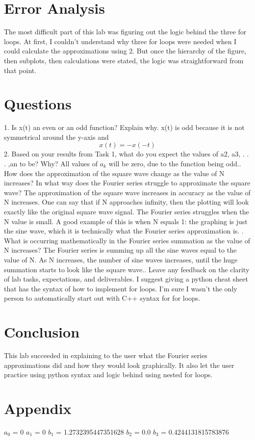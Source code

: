 \documentclass[12pt]{article}
\begin{document}
\section{Error Analysis}
The most difficult part of this lab was figuring out the logic behind the three for loops. At first, I couldn't understand why three for loops were needed when I could calculate the approximations using 2. But once the hierarchy of the figure, then subplots, then calculations were stated, the logic was straightforward from that point. 

\section{Questions}
1. Is x(t) an even or an odd function? Explain why.\newline
x(t) is odd because it is not symmetrical around the y-axis and \[x(t) = -x(-t)\]
2. Based on your results from Task 1, what do you expect the values of a2, a3, . . . ,an to be?
Why?\newline
All values of $a_k$ will be zero, due to the function being odd.. How does the approximation of the square wave change as the value of N increases? In what
way does the Fourier series struggle to approximate the square wave?\newline
The approximation of the square wave increases in accuracy as the value of N increases. One can say that if N approaches infinity, then the plotting will look exactly like the original square wave signal. The Fourier series struggles when the N value is small. A good example of this is when N equals 1: the graphing is just the sine wave, which it is technically what the Fourier series approximation is. 
. What is occurring mathematically in the Fourier series summation as the value of N increases?\newline
The Fourier series is summing up all the sine waves equal to the value of N. As N increases, the number of sine waves increases, until the huge summation starts to look like the square wave.. Leave any feedback on the clarity of lab tasks, expectations, and deliverables.
\newline
I suggest giving a python cheat sheet that has the syntax of how to implement for loops. I'm sure I wasn't the only person to automatically start out with C++ syntax for for loops.
\section{Conclusion}
This lab succeeded in explaining to the user what the Fourier series approximations did and how they would look graphically. It also let the user practice using python syntax and logic behind using nested for loops.
\clearpage

\section*{Appendix}
$a_0$ =  0\newline
$a_1$ =  0\newline
$b_1$ =  1.2732395447351628\newline
$b_2$ =  0.0\newline
$b_3$ =  0.4244131815783876\newline
\end{document}
